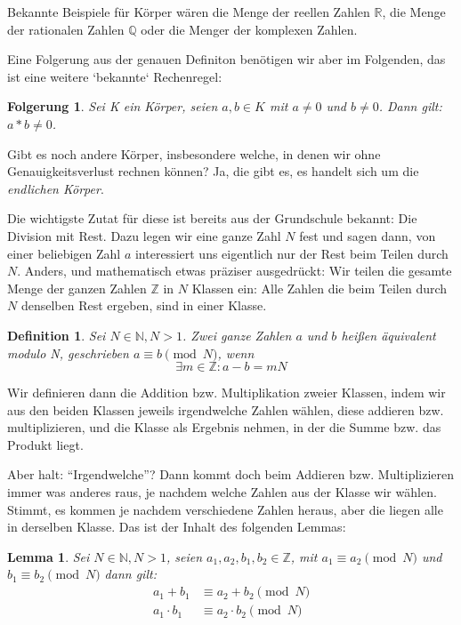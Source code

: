 \documentclass{article}
\newcommand{\N}{\mathbb{N}}
\newcommand{\Q}{\mathbb{Q}}
\newcommand{\R}{\mathbb{R}}
\newcommand{\Z}{\mathbb{Z}}
\newcounter{thm}
\newtheorem{folgerung}[thm]{Folgerung}
\newtheorem{definition}[thm]{Definition}
\newtheorem{lemma}[thm]{Lemma}
\begin{document}
Bekannte Beispiele für Körper wären die Menge der reellen
Zahlen $\R$, die Menge der rationalen Zahlen $\Q$ oder die Menger der
komplexen Zahlen.

Eine Folgerung aus der genauen Definiton benötigen wir aber im Folgenden, das
ist eine weitere `bekannte` Rechenregel:

  \begin{folgerung}
    Sei K ein Körper, seien $a, b \in K$ mit $a \ne 0$ und $b \ne 0$.  Dann
    gilt: $a * b \ne 0$.
  \end{folgerung}

Gibt es noch andere Körper, insbesondere welche, in denen wir ohne
Genauigkeitsverlust rechnen können? Ja, die gibt es, es handelt sich um die
\textit{endlichen Körper}.

Die wichtigste Zutat für diese ist bereits aus der Grundschule bekannt: Die
Division mit Rest. Dazu legen wir eine ganze Zahl $N$ fest und sagen dann,
von einer beliebigen Zahl $a$ interessiert uns eigentlich nur der Rest beim
Teilen durch $N$. Anders, und mathematisch etwas präziser ausgedrückt: Wir
teilen die gesamte Menge der ganzen Zahlen $\Z$ in $N$ Klassen ein: Alle Zahlen
die beim Teilen durch $N$ denselben Rest ergeben, sind in einer Klasse.

  \begin{definition}
    Sei $N \in \N, N > 1$. Zwei ganze Zahlen $a$ und $b$ heißen
    \emph{äquivalent modulo N}, geschrieben $a \equiv b \pmod N$, wenn
    $$ \exists m \in \Z: a-b = mN $$
  \end{definition}

Wir definieren dann die Addition bzw. Multiplikation zweier Klassen, indem wir
aus den beiden Klassen jeweils irgendwelche Zahlen wählen, diese addieren
bzw. multiplizieren, und die Klasse als Ergebnis nehmen, in der die Summe
bzw. das Produkt liegt.

Aber halt: ``Irgendwelche''? Dann kommt doch beim Addieren bzw. Multiplizieren
immer was anderes raus, je nachdem welche Zahlen aus der Klasse wir
wählen. Stimmt, es kommen je nachdem verschiedene Zahlen heraus, aber die
liegen alle in derselben Klasse. Das ist der Inhalt des folgenden Lemmas:

\begin{lemma}
    Sei $N \in \N, N > 1$, seien $a_1, a_2, b_1, b_2 \in \Z$,
    mit $a_1 \equiv a_2 \pmod N$ und $b_1 \equiv b_2 \pmod N$  dann gilt:
    \begin{equation}
      \begin{split}
        \label{op:mod}
        a_1 + b_1 & \equiv  a_2 + b_2 \pmod N \\
        a_1 \cdot b_1 & \equiv  a_2 \cdot b_2 \pmod N
      \end{split}
    \end{equation}
\end{lemma}
\end{document}
